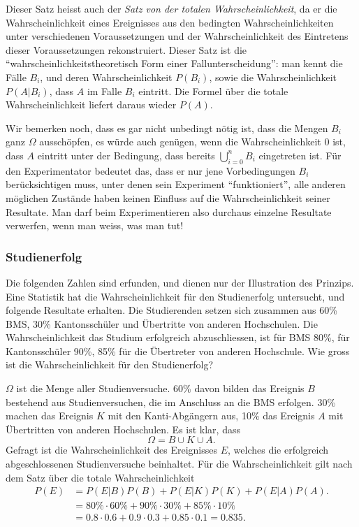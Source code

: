 Dieser Satz heisst auch der {\em Satz von der totalen Wahrscheinlichkeit},
da er die Wahrscheinlichkeit eines Ereignisses aus den bedingten
Wahrscheinlichkeiten unter verschiedenen Voraussetzungen und der
Wahrscheinlichkeit des Eintretens dieser Voraussetzungen rekonstruiert.
Dieser Satz ist die ``wahrscheinlichkeitstheoretisch Form einer
Fallunterscheidung'': man kennt die Fälle $B_i$, und deren Wahrscheinlichkeit
$P(B_i)$, sowie die Wahrscheinlichkeit $P(A|B_i)$, dass $A$ im Falle 
$B_i$ eintritt.
Die Formel über die totale Wahrscheinlichkeit
liefert daraus wieder $P(A)$.

Wir bemerken noch, dass es gar nicht unbedingt nötig ist, dass die Mengen
$B_i$ ganz $\Omega$ ausschöpfen, es würde auch
genügen, wenn die Wahrscheinlichkeit $0$ ist, dass $A$ eintritt
unter der Bedingung,
dass bereits $\bigcup_{i=0}^{n}B_i$ eingetreten ist.
Für den
Experimentator bedeutet das, dass er nur jene Vorbedingungen $B_i$
berücksichtigen muss, unter denen sein Experiment ``funktioniert'',
alle anderen möglichen Zustände haben keinen Einfluss auf
die Wahrscheinlichkeit seiner Resultate.
Man darf beim Experimentieren also durchaus einzelne Resultate
verwerfen, wenn man weiss, was man tut!

\subsubsection{Studienerfolg}
Die folgenden Zahlen sind erfunden, und dienen nur der Illustration
des Prinzips.
Eine Statistik hat die Wahrscheinlichkeit für den
Studienerfolg untersucht, und folgende Resultate erhalten.
Die Studierenden setzen sich zusammen aus 60\% BMS, 30\% Kantonsschüler
und Übertritte von anderen Hochschulen.
Die Wahrscheinlichkeit
das Studium erfolgreich abzuschliessen, ist für BMS 80\%,
für Kantonsschüler 90\%, 85\% für die Übertreter von anderen
Hochschule.
Wie gross ist die Wahrscheinlichkeit für den Studienerfolg?

$\Omega$ ist die Menge aller Studienversuche.
60\% davon bilden das
Ereignis $B$ bestehend aus Studienversuchen, die im Anschluss an die BMS
erfolgen.
30\% machen das Ereignis $K$ mit den Kanti-Abgängern aus,
10\% das Ereignis $A$ mit Übertritten von anderen Hochschulen.
Es ist klar, dass 
\[
\Omega = B \cup K\cup A.
\]
Gefragt ist die Wahrscheinlichkeit des Ereignisses $E$, welches
die erfolgreich abgeschlossenen Studienversuche beinhaltet.
Für die Wahrscheinlichkeit gilt nach dem Satz über die totale
Wahrscheinlichkeit
\begin{align*}
P(E)&=P(E|B)P(B)+P(E|K)P(K)+P(E|A)P(A).
\\
    &= 80\%\cdot 60\%
     + 90\%\cdot 30\%
     + 85\%\cdot 10\%
\\
&=0.8\cdot 0.6 + 0.9 \cdot 0.3 + 0.85 \cdot 0.1 = 0.835.
\end{align*}

